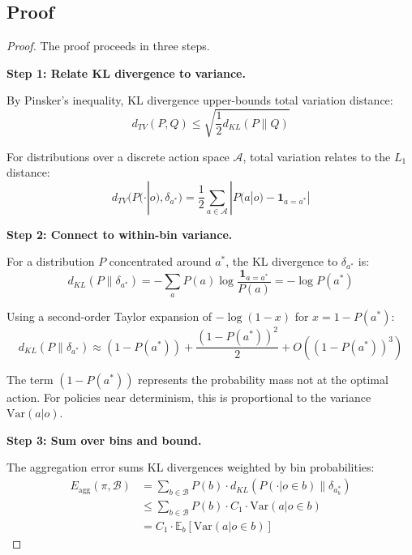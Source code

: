 \subsection{Proof}

\begin{proof}
The proof proceeds in three steps.

\textbf{Step 1: Relate KL divergence to variance.}

By Pinsker's inequality, KL divergence upper-bounds total variation distance:
\begin{equation}
d_{TV}(P, Q) \leq \sqrt{\frac{1}{2} d_{KL}(P \| Q)}
\end{equation}

For distributions over a discrete action space $\mathcal{A}$, total variation relates to the $L_1$ distance:
\begin{equation}
d_{TV}(P(\cdot|o), \delta_{a^*}) = \frac{1}{2} \sum_{a \in \mathcal{A}} |P(a|o) - \mathbf{1}_{a = a^*}|
\end{equation}

\textbf{Step 2: Connect to within-bin variance.}

For a distribution $P$ concentrated around $a^*$, the KL divergence to $\delta_{a^*}$ is:
\begin{equation}
d_{KL}(P \| \delta_{a^*}) = -\sum_{a} P(a) \log \frac{\mathbf{1}_{a=a^*}}{P(a)} = -\log P(a^*)
\end{equation}

Using a second-order Taylor expansion of $-\log(1 - x)$ for $x = 1 - P(a^*)$:
\begin{equation}
d_{KL}(P \| \delta_{a^*}) \approx (1 - P(a^*)) + \frac{(1 - P(a^*))^2}{2} + O((1-P(a^*))^3)
\end{equation}

The term $(1 - P(a^*))$ represents the probability mass not at the optimal action. For policies near determinism, this is proportional to the variance $\text{Var}(a|o)$.

\textbf{Step 3: Sum over bins and bound.}

The aggregation error sums KL divergences weighted by bin probabilities:
\begin{align}
E_{\text{agg}}(\pi, \mathcal{B}) &= \sum_{b \in \mathcal{B}} P(b) \cdot d_{KL}(P(\cdot | o \in b) \| \delta_{a^*_b}) \\
&\leq \sum_{b \in \mathcal{B}} P(b) \cdot C_1 \cdot \text{Var}(a | o \in b) \\
&= C_1 \cdot \mathbb{E}_b[\text{Var}(a | o \in b)]
\end{align}


\end{proof}
